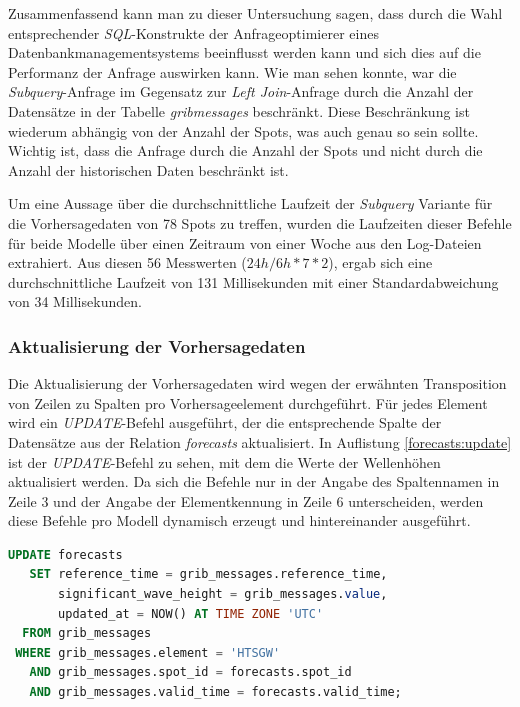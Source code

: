 Zusammenfassend kann man zu dieser Untersuchung sagen, dass durch die
Wahl entsprechender \textit{SQL}-Konstrukte der Anfrageoptimierer
eines Datenbankmanagementsystems beeinflusst werden kann und sich dies
auf die Performanz der Anfrage auswirken kann. Wie man sehen konnte,
war die \textit{Subquery}-Anfrage im Gegensatz zur \textit{Left
  Join}-Anfrage durch die Anzahl der Datensätze in der Tabelle
\textit{grib\textunderscore messages} beschränkt. Diese Beschränkung
ist wiederum abhängig von der Anzahl der Spots, was auch genau so sein
sollte. Wichtig ist, dass die Anfrage durch die Anzahl der Spots und
nicht durch die Anzahl der historischen Daten beschränkt ist.

Um eine Aussage über die durchschnittliche Laufzeit der
\textit{Subquery} Variante für die Vorhersagedaten von 78 Spots zu
treffen, wurden die Laufzeiten dieser Befehle für beide Modelle über
einen Zeitraum von einer Woche aus den Log-Dateien extrahiert. Aus
diesen 56 Messwerten ($24h/6h * 7 * 2$), ergab sich eine
durchschnittliche Laufzeit von 131 Millisekunden mit einer
Standardabweichung von 34 Millisekunden.

\subsubsection{Aktualisierung der Vorhersagedaten}
Die Aktualisierung der Vorhersagedaten wird wegen der erwähnten
Transposition von Zeilen zu Spalten pro Vorhersageelement
durchgeführt. Für jedes Element wird ein \textit{UPDATE}-Befehl
ausgeführt, der die entsprechende Spalte der Datensätze aus der
Relation \textit{forecasts} aktualisiert. In Auflistung
\ref{forecasts:update} ist der \textit{UPDATE}-Befehl zu sehen, mit
dem die Werte der Wellenhöhen aktualisiert werden. Da sich die Befehle
nur in der Angabe des Spaltennamen in Zeile 3 und der Angabe der
Elementkennung in Zeile 6 unterscheiden, werden diese Befehle pro
Modell dynamisch erzeugt und hintereinander ausgeführt.

\begin{lstlisting}[captionpos=b, caption=Aktualisierung der Wellenhöhe, label=forecasts:update, language=SQL]
UPDATE forecasts
   SET reference_time = grib_messages.reference_time,
       significant_wave_height = grib_messages.value,
       updated_at = NOW() AT TIME ZONE 'UTC'
  FROM grib_messages
 WHERE grib_messages.element = 'HTSGW'
   AND grib_messages.spot_id = forecasts.spot_id
   AND grib_messages.valid_time = forecasts.valid_time;
\end{lstlisting}

